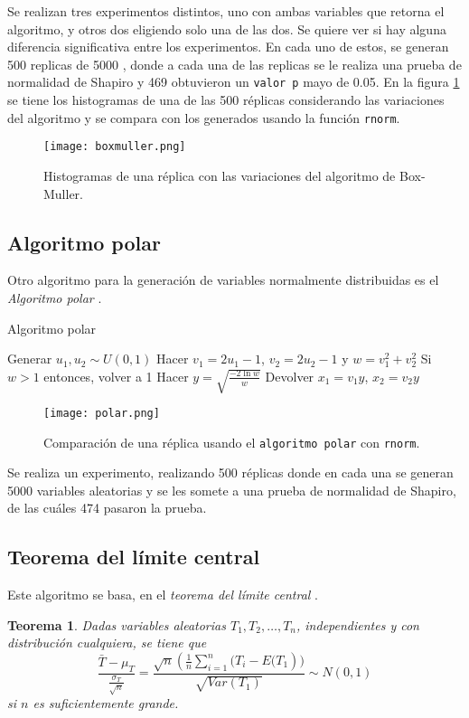 \documentclass[12pt,letterpaper]{article}
\newtheorem{theorem}{Teorema}
\begin{document}
Se realizan tres experimentos distintos, uno con ambas variables que retorna el algoritmo, y otros dos eligiendo solo una de las dos. Se quiere ver si hay alguna diferencia significativa entre los experimentos. En cada uno de estos, se generan 500 replicas de 5000 , donde a cada una de las replicas se le realiza una prueba de normalidad de Shapiro y 469 obtuvieron un \texttt{valor p} mayo de 0.05. En la figura \ref{boxmuller} se tiene los histogramas de una de las 500 réplicas considerando las variaciones del algoritmo y se compara con los generados usando la función \texttt{rnorm}.



\begin{figure}
\centering
\texttt{[image: boxmuller.png]}
\caption{Histogramas de una réplica con las variaciones del algoritmo de Box-Muller.} 	
\label{boxmuller}
\end{figure} 


\subsection{Algoritmo polar}
Otro algoritmo para la generación de variables normalmente  distribuidas es el \textit{Algoritmo polar} \cite{int}. 

\begin{algorithm}
  \caption{Algoritmo polar}
  \begin{algorithmic}[1]
 
    \State Generar  $u_1, u_2 \sim U(0,1)$ 
    \State Hacer $v_1 = 2u_1 - 1 $, $v_2=2u_2 - 1$ y $w=v_1^2 + v_2^2$
    \State Si $w>1$ entonces, volver a 1
    \State Hacer $y=\sqrt{\frac{-2\ln w}{w}}$
    \State Devolver $x_1=v_1 y$, $x_2=v_2 y$
 
  \end{algorithmic}
\end{algorithm}

\begin{figure}
\centering
\texttt{[image: polar.png]}
\caption{Comparación de una réplica usando el \texttt{algoritmo polar} con \texttt{rnorm}.} 	
\label{polar}
\end{figure} 

Se realiza un experimento, realizando 500 réplicas donde en cada una se generan 5000 variables aleatorias y se les somete a una prueba de normalidad de Shapiro, de las cuáles 474 pasaron la prueba. 


\subsection{Teorema del límite central}
Este algoritmo se basa, en el \textit{teorema del límite central} \cite{int}. 
\begin{theorem}
Dadas variables aleatorias $T_1, T_2, \ldots, T_n$, independientes y con distribución cualquiera, se tiene que
$$\frac{\bar{T}-\mu_T}{\frac{\sigma_T}{\sqrt{n}}} = \frac{\sqrt{n}\left(\frac{1}{n}\sum^n_{i=1} (T_i - E(T_1\right))}{\sqrt{Var(T_1)}} \sim N(0,1)$$
si $n$ es suficientemente grande.
\end{theorem}
\end{document}
